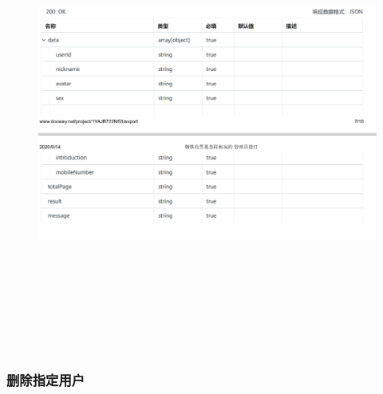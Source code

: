     \begin{figure}[h]
        \centering
        \includegraphics[height=15.0cm,width=14.0cm]{design/image/api40.png} 
        \end{figure}  
        \newpage
    
\subsubsection{删除指定用户}

